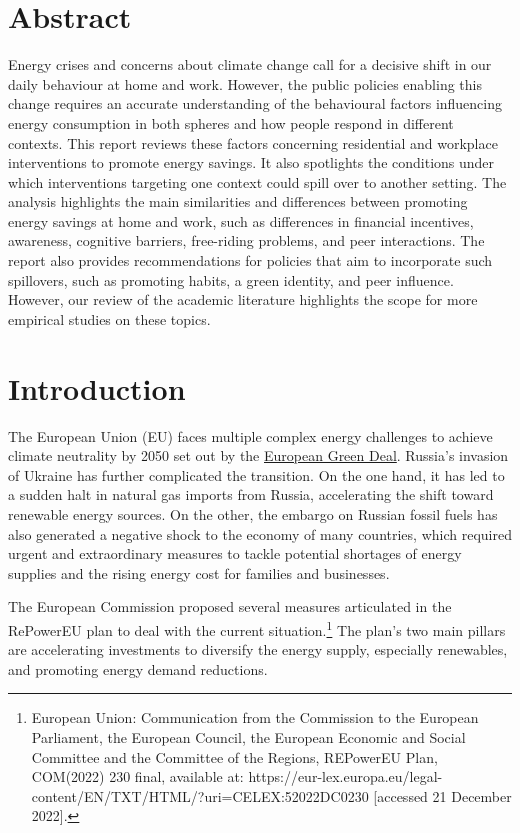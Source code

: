 \documentclass[
  11pt,
  captions=heading]{scrreport}
\begin{document}
\clearpage

\hypertarget{abstract}{%
\chapter*{Abstract}\label{abstract}}

Energy crises and concerns about climate change call for a decisive
shift in our daily behaviour at home and work. However, the public
policies enabling this change requires an accurate understanding of the
behavioural factors influencing energy consumption in both spheres and
how people respond in different contexts. This report reviews these
factors concerning residential and workplace interventions to promote
energy savings. It also spotlights the conditions under which
interventions targeting one context could spill over to another setting.
The analysis highlights the main similarities and differences between
promoting energy savings at home and work, such as differences in
financial incentives, awareness, cognitive barriers, free-riding
problems, and peer interactions. The report also provides
recommendations for policies that aim to incorporate such spillovers,
such as promoting habits, a green identity, and peer influence. However,
our review of the academic literature highlights the scope for more
empirical studies on these topics.

\hypertarget{introduction}{%
\chapter{Introduction}\label{introduction}}

The European Union (EU) faces multiple complex energy challenges to
achieve climate neutrality by 2050 set out by the \href{}{European Green
Deal}. Russia's invasion of Ukraine has further complicated the
transition. On the one hand, it has led to a sudden halt in natural gas
imports from Russia, accelerating the shift toward renewable energy
sources. On the other, the embargo on Russian fossil fuels has also
generated a negative shock to the economy of many countries, which
required urgent and extraordinary measures to tackle potential shortages
of energy supplies and the rising energy cost for families and
businesses.

The European Commission proposed several measures articulated in the
RePowerEU plan to deal with the current situation.\footnote{European
  Union: Communication from the Commission to the European Parliament,
  the European Council, the European Economic and Social Committee and
  the Committee of the Regions, REPowerEU Plan, COM(2022) 230 final,
  available at:
  https://eur-lex.europa.eu/legal-content/EN/TXT/HTML/?uri=CELEX:52022DC0230
  {[}accessed 21 December 2022{]}.} The plan's two main pillars are
accelerating investments to diversify the energy supply, especially
renewables, and promoting energy demand reductions.
\end{document}
